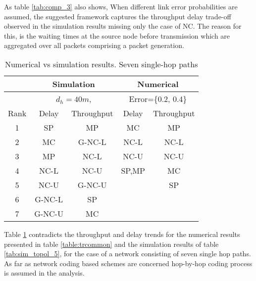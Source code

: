 \documentclass[journal, onecolumn, 12pt]{IEEEtran}
\begin{document}
As table \ref{tab:comp_3} also shows, When different link error probabilities are assumed, the suggested framework captures the throughput delay trade-off observed in the simulation results missing only the case of NC.
The reason for this, is the waiting times at the source node before transmission which are aggregated over all packets comprising a packet generation.
\begin{table}[h]
\begin{center}
\scriptsize
\begin{tabular}{|c|c|c|c|c|}
\hline
     & \multicolumn{2}{|c|}{Simulation}     & \multicolumn{2}{|c|}{Numerical}                                   \\ \hline
     & \multicolumn{2}{|c|}{$d_{h}=40m$,} & \multicolumn{2}{|c|}{Error=\{0.2, 0.4\}} \\ \hline
Rank & Delay               & Throughput              & Delay            & Throughput            \\ \hline
1    & SP                 & MP                & MC              & MP          \\ \hline
2    & MC                 & G-NC-L                & NC-L              & NC-L      \\ \hline
3    & MP                & NC-L                & NC-U              & NC-U   \\ \hline
4    & NC-L               & NC-U                & SP,MP              & MC   \\ \hline
5    & NC-U              & G-NC-U                &               & SP     \\ \hline
6    & G-NC-L            & SP               &               &           \\ \hline
7    & G-NC-U            & MC                &               &           \\ \hline
\end{tabular}
\end{center}
\caption{Numerical vs simulation results. Seven single-hop paths}
\label{tab:comp_4}
\end{table}

Table \ref{tab:comp_4} contradicts the throughput and delay trends for the numerical results presented in table \ref{table:trcommon} and the simulation results of table \ref{tab:sim_topol_5},
for the case of a network consisting of seven single hop paths.
As far as network coding based schemes are concerned hop-by-hop coding process is assumed in the analysis.
\end{document}
